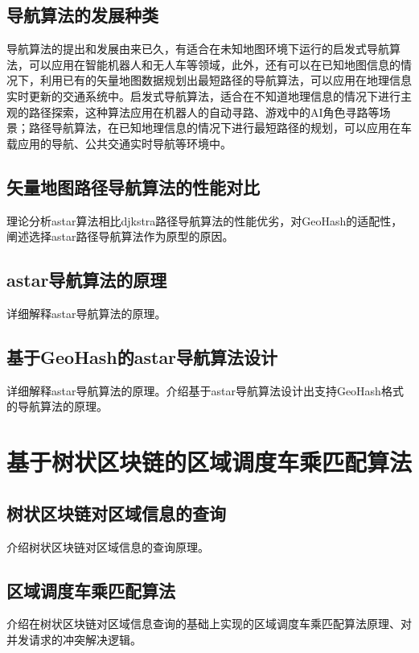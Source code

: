 \subsection{导航算法的发展种类}
导航算法的提出和发展由来已久，有适合在未知地图环境下运行的启发式导航算法，可以应用在智能机器人和无人车等领域，此外，还有可以在已知地图信息的情况下，利用已有的矢量地图数据规划出最短路径的导航算法，可以应用在地理信息实时更新的交通系统中。启发式导航算法，适合在不知道地理信息的情况下进行主观的路径探索，这种算法应用在机器人的自动寻路、游戏中的AI角色寻路等场景；路径导航算法，在已知地理信息的情况下进行最短路径的规划，可以应用在车载应用的导航、公共交通实时导航等环境中。
\subsection{矢量地图路径导航算法的性能对比}
理论分析astar算法相比djkstra路径导航算法的性能优劣，对GeoHash的适配性，阐述选择astar路径导航算法作为原型的原因。
\subsection{astar导航算法的原理}
详细解释astar导航算法的原理。
\subsection{基于GeoHash的astar导航算法设计}
详细解释astar导航算法的原理。介绍基于astar导航算法设计出支持GeoHash格式的导航算法的原理。

\section{基于树状区块链的区域调度车乘匹配算法}
\subsection{树状区块链对区域信息的查询}
介绍树状区块链对区域信息的查询原理。
\subsection{区域调度车乘匹配算法}
介绍在树状区块链对区域信息查询的基础上实现的区域调度车乘匹配算法原理、对并发请求的冲突解决逻辑。